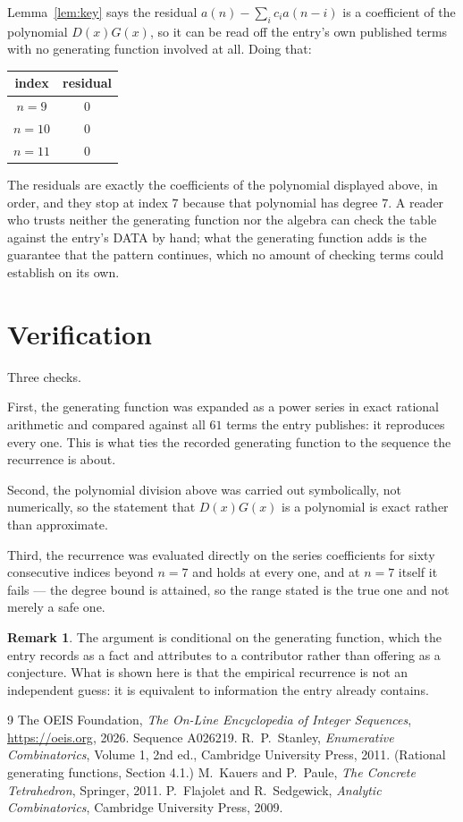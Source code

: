 \documentclass[11pt,a4paper]{article}
\theoremstyle{plain}
\theoremstyle{definition}
\newtheorem{remark}[theorem]{Remark}
\begin{document}
Lemma~\ref{lem:key} says the residual $a(n)-\sum_ic_ia(n-i)$ is a coefficient of the
polynomial $D(x)G(x)$, so it can be read off the entry's own published terms with no
generating function involved at all. Doing that:
\begin{center}
\begin{tabular}{cc}
index & residual \\ \hline
$n=9$ & $0$ \\
$n=10$ & $0$ \\
$n=11$ & $0$
\end{tabular}
\end{center}
The residuals are exactly the coefficients of the polynomial displayed above, in order, and
they stop at index $7$ because that polynomial has degree $7$. A reader who trusts
neither the generating function nor the algebra can check the table against the entry's DATA
by hand; what the generating function adds is the guarantee that the pattern continues, which
no amount of checking terms could establish on its own.

\section{Verification}

Three checks.

First, the generating function was expanded as a power series in exact rational arithmetic and
compared against all $61$ terms the entry publishes: it reproduces every one. This is
what ties the recorded generating function to the sequence the recurrence is about.

Second, the polynomial division above was carried out symbolically, not numerically, so the
statement that $D(x)G(x)$ is a polynomial is exact rather than approximate.

Third, the recurrence was evaluated directly on the series coefficients for sixty consecutive
indices beyond $n=7$ and holds at every one, and at $n=7$ itself it fails --- the
degree bound is attained, so the range stated is the true one and not merely a safe one.

\begin{remark}
The argument is conditional on the generating function, which the entry records as a fact and
attributes to a contributor rather than offering as a conjecture. What is shown here is that
the empirical recurrence is not an independent guess: it is equivalent to information the
entry already contains.
\end{remark}

\begin{thebibliography}{9}
 The OEIS Foundation, \emph{The On-Line Encyclopedia of Integer
Sequences}, \url{https://oeis.org}, 2026. Sequence A026219.
 R.~P.~Stanley, \emph{Enumerative Combinatorics}, Volume 1, 2nd ed.,
Cambridge University Press, 2011. (Rational generating functions, Section 4.1.)
 M.~Kauers and P.~Paule, \emph{The Concrete Tetrahedron}, Springer, 2011.
 P.~Flajolet and R.~Sedgewick, \emph{Analytic Combinatorics}, Cambridge
University Press, 2009.
\end{thebibliography}
\end{document}
